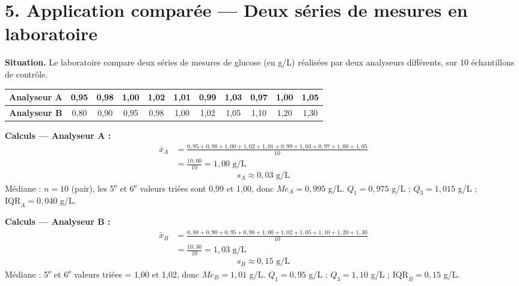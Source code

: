 \documentclass[11pt,a4paper]{article}
\begin{document}
\newpage

\section*{5. Application comparée — Deux séries de mesures en laboratoire}

\begin{exemple}
\textbf{Situation.} Le laboratoire compare deux séries de mesures de glucose (en g/L) réalisées par deux analyseurs différents, sur 10 échantillons de contrôle.

\vspace{0.2cm}
\begin{center}
\begin{tabular}{|c|c|c|c|c|c|c|c|c|c|c|}
\hline
\textbf{Analyseur A} & 0{,}95 & 0{,}98 & 1{,}00 & 1{,}02 & 1{,}01 & 0{,}99 & 1{,}03 & 0{,}97 & 1{,}00 & 1{,}05 \\
\hline
\textbf{Analyseur B} & 0{,}80 & 0{,}90 & 0{,}95 & 0{,}98 & 1{,}00 & 1{,}02 & 1{,}05 & 1{,}10 & 1{,}20 & 1{,}30 \\
\hline
\end{tabular}
\end{center}

\vspace{0.2cm}
\textbf{Calculs — Analyseur A :}
\begin{align*}
\bar{x}_A &= \frac{0{,}95 + 0{,}98 + 1{,}00 + 1{,}02 + 1{,}01 + 0{,}99 + 1{,}03 + 0{,}97 + 1{,}00 + 1{,}05}{10} \\
&= \frac{10{,}00}{10} = 1{,}00 \text{ g/L}
\end{align*}
\[
s_A \approx 0{,}03 \text{ g/L}
\]
Médiane : $n = 10$ (pair), les 5\textsuperscript{e} et 6\textsuperscript{e} valeurs triées sont 0,99 et 1,00, donc $Me_A = 0{,}995$ g/L.
$Q_1 = 0{,}975$ g/L ; $Q_3 = 1{,}015$ g/L ; $\text{IQR}_A = 0{,}040$ g/L.

\vspace{0.2cm}
\textbf{Calculs — Analyseur B :}
\begin{align*}
\bar{x}_B &= \frac{0{,}80 + 0{,}90 + 0{,}95 + 0{,}98 + 1{,}00 + 1{,}02 + 1{,}05 + 1{,}10 + 1{,}20 + 1{,}30}{10} \\
&= \frac{10{,}30}{10} = 1{,}03 \text{ g/L}
\end{align*}
\[
s_B \approx 0{,}15 \text{ g/L}
\]
Médiane : 5\textsuperscript{e} et 6\textsuperscript{e} valeurs triées = 1,00 et 1,02, donc $Me_B = 1{,}01$ g/L.
$Q_1 = 0{,}95$ g/L ; $Q_3 = 1{,}10$ g/L ; $\text{IQR}_B = 0{,}15$ g/L.


\end{exemple}
\end{document}
